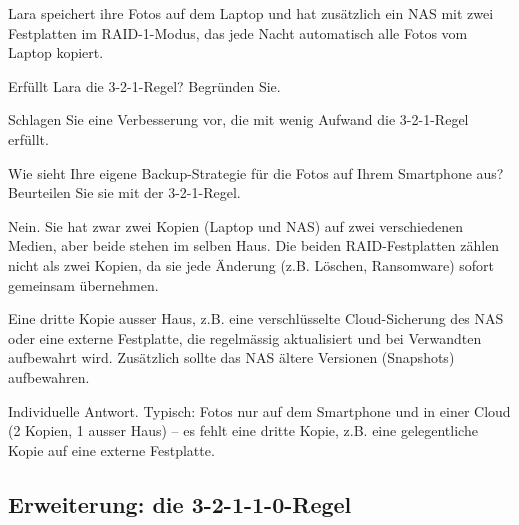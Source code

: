 \begin{myexercise}
    Lara speichert ihre Fotos auf dem Laptop und hat zusätzlich ein \acrshort{NAS} mit zwei Festplatten im \acrshort{RAID}-1-Modus, das jede Nacht automatisch alle Fotos vom Laptop kopiert.
    \begin{aenum}
        \item Erfüllt Lara die 3-2-1-Regel? Begründen Sie.
        \item Schlagen Sie eine Verbesserung vor, die mit wenig Aufwand die 3-2-1-Regel erfüllt.
        \item Wie sieht Ihre eigene Backup-Strategie für die Fotos auf Ihrem Smartphone aus? Beurteilen Sie sie mit der 3-2-1-Regel.
    \end{aenum}

    \begin{myanswer}
        \begin{aenum}
            \item Nein. Sie hat zwar zwei Kopien (Laptop und \acrshort{NAS}) auf zwei verschiedenen Medien, aber beide stehen im selben Haus. Die beiden \acrshort{RAID}-Festplatten zählen nicht als zwei Kopien, da sie jede Änderung (z.B. Löschen, Ransomware) sofort gemeinsam übernehmen.
            \item Eine dritte Kopie ausser Haus, z.B. eine verschlüsselte Cloud-Sicherung des \acrshort{NAS} oder eine externe Festplatte, die regelmässig aktualisiert und bei Verwandten aufbewahrt wird. Zusätzlich sollte das \acrshort{NAS} ältere Versionen (Snapshots) aufbewahren.
            \item Individuelle Antwort. Typisch: Fotos nur auf dem Smartphone und in einer Cloud (2 Kopien, 1 ausser Haus) -- es fehlt eine dritte Kopie, z.B. eine gelegentliche Kopie auf eine externe Festplatte.
        \end{aenum}
    \end{myanswer}
\end{myexercise}

\subsection{Erweiterung: die 3-2-1-1-0-Regel}\label{sec:backup32110}

